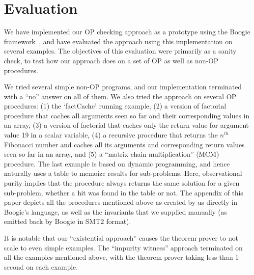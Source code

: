 \section{Evaluation}\label{sec:experiments}

We have implemented our OP checking approach as a prototype using the Boogie
framework~\cite{leino2008boogie}, and have evaluated the approach using
this implementation on several examples. The objectives of this evaluation
were primarily as a sanity check, to test how our approach does on a set of
OP as well as non-OP procedures.

We tried several simple non-OP programs, and our implementation terminated
with a ``no'' answer on all of them.  We also tried the approach on several
OP procedures: (1) the `factCache' running example, (2) a version of
factorial procedure that caches all arguments seen so far and their
corresponding values in an array, (3) a version of factorial that caches
only the return value for argument value 19 in a scalar variable, (4) a
recursive procedure that returns the $n^\mathit{th}$ Fibonacci number and
caches all its arguments and corresponding return values seen so far in an
array, and (5) a ``matrix chain multiplication'' (MCM) procedure.
The last example  is based
on dynamic programming, and hence naturally uses a table to memoize 
results for sub-problems. Here, observational purity implies that the procedure always
returns the same solution for a given sub-problem, whether a hit was found
in the table or not.  The appendix of this paper depicts all the procedures
mentioned above as created by us directly in Boogie's language, as well as
the invariants that we supplied manually (as emitted back by Boogie in  SMT2
format).


It is notable that our ``existential approach'' causes the theorem prover
to not scale to even simple examples. The ``impurity witness'' approach
terminated on all the examples mentioned above, with the theorem prover
taking less than 1 second on each example.


